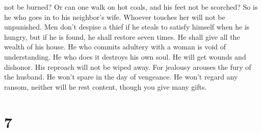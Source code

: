 not be burned?  Or can one walk on hot coals, and his
feet not be scorched?  So is he who goes in to his
neighbor's wife. Whoever touches her will not be unpunished.
 Men don't despise a thief if he steals to satisfy
himself when he is hungry,  but if he is found, he shall
restore seven times. He shall give all the wealth of his house.
 He who commits adultery with a woman is void of
understanding. He who does it destroys his own soul.  He
will get wounds and dishonor. His reproach will not be wiped away.
 For jealousy arouses the fury of the husband. He won't
spare in the day of vengeance.  He won't regard any
ransom, neither will he rest content, though you give many gifts.

\hypertarget{section-6}{%
\section{7}\label{section-6}}

